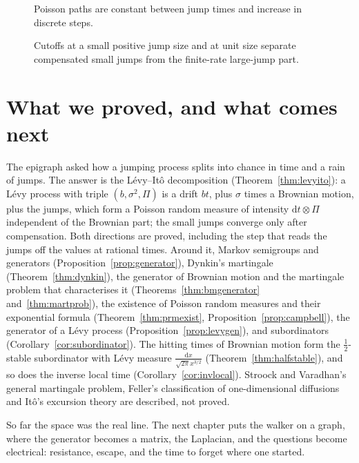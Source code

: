 \begin{figure}[ht]
\centering
{}
\caption{Poisson paths are constant between jump times and increase in discrete steps.}
\label{fig:v12jumpprocess}
\end{figure}

\begin{figure}[ht]
\centering
{}
\caption{Cutoffs at a small positive jump size and at unit size separate compensated small jumps from the finite-rate large-jump part.}
\label{fig:v12levytruncation}
\end{figure}

\section{What we proved, and what comes next}

The epigraph asked how a jumping process splits into chance in time and a rain of jumps. The answer is the L\'evy--It\^o decomposition (Theorem~\ref{thm:levyito}): a L\'evy process with triple $(b,\sigma^2,\Pi)$ is a drift $bt$, plus $\sigma$ times a Brownian motion, plus the jumps, which form a Poisson random measure of intensity $\mathrm dt\otimes\Pi$ independent of the Brownian part; the small jumps converge only after compensation. Both directions are proved, including the step that reads the jumps off the values at rational times. Around it, Markov semigroups and generators (Proposition~\ref{prop:generator}), Dynkin's martingale (Theorem~\ref{thm:dynkin}), the generator of Brownian motion and the martingale problem that characterises it (Theorems~\ref{thm:bmgenerator} and~\ref{thm:martprob}), the existence of Poisson random measures and their exponential formula (Theorem~\ref{thm:prmexist}, Proposition~\ref{prop:campbell}), the generator of a L\'evy process (Proposition~\ref{prop:levygen}), and subordinators (Corollary~\ref{cor:subordinator}). The hitting times of Brownian motion form the $\frac12$-stable subordinator with L\'evy measure $\frac{\mathrm dx}{\sqrt{2\pi}x^{3/2}}$ (Theorem~\ref{thm:halfstable}), and so does the inverse local time (Corollary~\ref{cor:invlocal}). Stroock and Varadhan's general martingale problem, Feller's classification of one-dimensional diffusions and It\^o's excursion theory are described, not proved.

So far the space was the real line. The next chapter puts the walker on a graph, where the generator becomes a matrix, the Laplacian, and the questions become electrical: resistance, escape, and the time to forget where one started.

